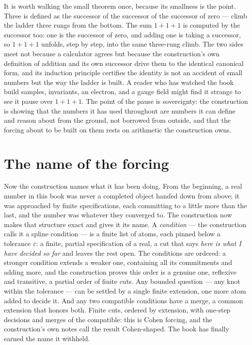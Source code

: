 It is worth walking the small theorem once, because its smallness is the point. Three is defined as the
successor of the successor of the successor of zero --- climb the ladder three rungs from the bottom. The
sum $1+1+1$ is computed by the successor too: one is the successor of zero, and adding one is taking a
successor, so $1+1+1$ unfolds, step by step, into the same three-rung climb. The two sides meet not
because a calculator agrees but because the construction's own definition of addition and its own
successor drive them to the identical canonical form, and its induction principle certifies the identity
is not an accident of small numbers but the way the ladder is built. A reader who has watched the book
build samples, invariants, an electron, and a gauge field might find it strange to see it pause over
$1+1+1$. The point of the pause is sovereignty: the construction is showing that the numbers it has used
throughout are numbers it can define and reason about from the ground, not borrowed from outside, and
that the forcing about to be built on them rests on arithmetic the construction owns.

\section{The name of the forcing}
\label{se:the-name-of-the-forcing}

Now the construction names what it has been doing. From the beginning, a real number in this book was
never a completed object handed down from above; it was approached by finite specifications, each
committing to a little more than the last, and the number was whatever they converged to. The
construction now makes that structure exact and gives it its name. A \emph{condition} --- the
construction calls it a spline condition --- is a finite list of atoms, each pinned below a tolerance
$\varepsilon$: a finite, partial specification of a real, a cut that says \emph{here is what I have
decided so far} and leaves the rest open. The conditions are ordered: a stronger condition extends a
weaker one, containing all its commitments and adding more, and the construction proves this order is a
genuine one, reflexive and transitive, a partial order of finite cuts. Any bounded question --- any knot
within the tolerance --- can be settled by a single finite extension, one more atom added to decide it.
And any two compatible conditions have a merge, a common extension that honors both. Finite cuts, ordered
by extension, with one-step decisions and merges of the compatible: this is Cohen forcing, and the
construction's own notes call the result Cohen-shaped. The book has finally earned the name it withheld.

